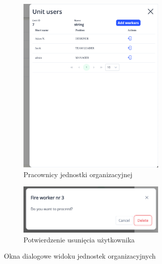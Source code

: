 \begin{figure}[H]
\begin{subfigure}[b]{0.49\textwidth}
        \includegraphics[width=0.8\textwidth, frame]{graf/front/unitWorkers.png}
        \caption{Pracownicy jednostki organizacyjnej}
    \end{subfigure}
    \begin{subfigure}[b]{0.7\textwidth}
        \centering
        \includegraphics[width=0.8\textwidth, frame]{graf/front/confirmWorkerDelete.png}
        \caption{Potwierdzenie usunięcia użytkownika}
    \end{subfigure}
    \caption{Okna dialogowe widoku jednostek organizacyjnych}
    \label{fig:unitDialogs}
\end{figure}

